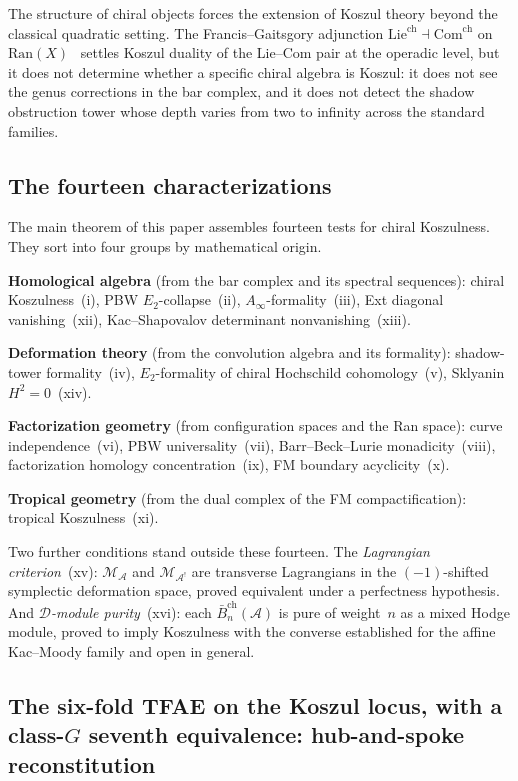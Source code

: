 \documentclass[11pt,reqno]{amsart}
\theoremstyle{definition}
\theoremstyle{remark}
\newcommand{\cA}{\mathcal{A}}
\newcommand{\cD}{\mathcal{D}}
\newcommand{\cM}{\mathcal{M}}
\newcommand{\barBch}{\bar{B}^{\mathrm{ch}}}
\newcommand{\Ran}{\mathrm{Ran}}
\newcommand{\Etwo}{E_2}
\newcommand{\Ainfty}{A_\infty}
\numberwithin{equation}{section}
\begin{document}
The structure of chiral objects forces the extension of Koszul
theory beyond the classical quadratic setting. The
Francis--Gaitsgory adjunction
$\mathrm{Lie}^{\mathrm{ch}} \dashv \mathrm{Com}^{\mathrm{ch}}$
on $\Ran(X)$~\cite{FG12} settles Koszul duality of the
Lie--Com pair at the operadic level, but it does not determine
whether a specific chiral algebra is Koszul: it does not see the
genus corrections in the bar complex, and it does not detect the
shadow obstruction tower whose depth varies from two to infinity
across the standard families.

\subsection{The fourteen characterizations}

The main theorem of this paper assembles fourteen tests for
chiral Koszulness. They sort into four groups by mathematical
origin.

\smallskip
\noindent
\textbf{Homological algebra} (from the bar complex and its
spectral sequences): chiral Koszulness~(i), PBW
$\Etwo$-collapse~(ii), $\Ainfty$-formality~(iii), Ext
diagonal vanishing~(xii), Kac--Shapovalov determinant
nonvanishing~(xiii).

\smallskip
\noindent
\textbf{Deformation theory} (from the convolution algebra and
its formality): shadow-tower formality~(iv),
$\Etwo$-formality of chiral Hochschild cohomology~(v),
Sklyanin $H^2 = 0$~(xiv).

\smallskip
\noindent
\textbf{Factorization geometry} (from configuration spaces and
the Ran space): curve independence~(vi), PBW
universality~(vii), Barr--Beck--Lurie monadicity~(viii),
factorization homology concentration~(ix),
FM boundary acyclicity~(x).

\smallskip
\noindent
\textbf{Tropical geometry} (from the dual complex of the FM
compactification): tropical Koszulness~(xi).

\smallskip
\noindent
Two further conditions stand outside these fourteen. The
\emph{Lagrangian criterion}~(xv): $\cM_\cA$ and $\cM_{\cA^!}$
are transverse Lagrangians in the $(-1)$-shifted symplectic
deformation space, proved equivalent under a perfectness
hypothesis. And \emph{$\cD$-module purity}~(xvi): each
$\barBch_n(\cA)$ is pure of weight~$n$ as a mixed Hodge module,
proved to imply Koszulness with the converse established for
the affine Kac--Moody family and open in general.

\subsection{The six-fold TFAE on the Koszul locus, with a class-$G$
seventh equivalence: hub-and-spoke reconstitution}
\label{subsec:seven-fold-tfae-hub-spoke}
\end{document}

